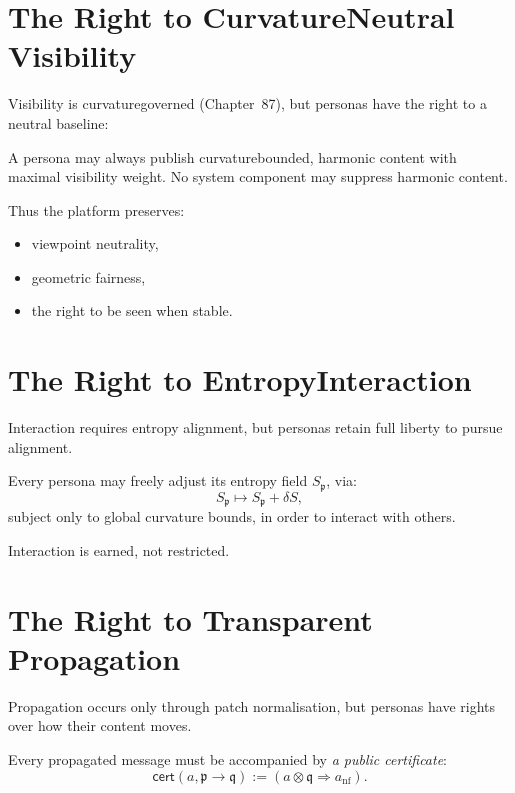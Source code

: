 \section{The Right to Curvature\textendash Neutral Visibility}

Visibility is curvature\textendash governed (Chapter~87),
but personas have the right to a neutral baseline:

\begin{invariant}
A persona may always publish curvature\textendash bounded, harmonic content
with maximal visibility weight.
No system component may suppress harmonic content.
\end{invariant}

Thus the platform preserves:
\begin{itemize}
    \item viewpoint neutrality,
    \item geometric fairness,
    \item the right to be seen when stable.
\end{itemize}

\section{The Right to Entropy\textendashAligned Interaction}

Interaction requires entropy alignment,
but personas retain full liberty to pursue alignment.

\begin{invariant}
Every persona may freely adjust its entropy field $S_{\mathfrak{p}}$,
via:
\[
S_{\mathfrak{p}} \mapsto S_{\mathfrak{p}} + \delta S,
\]
subject only to global curvature bounds,
in order to interact with others.
\end{invariant}

Interaction is earned,
not restricted.

\section{The Right to Transparent Propagation}

Propagation occurs only through patch normalisation,
but personas have rights over how their content moves.

\begin{invariant}
Every propagated message must be accompanied by
\emph{a public certificate}:
\[
\mathsf{cert}(a,\mathfrak{p}\to\mathfrak{q})
  := (a \otimes \mathfrak{q} \Rightarrow a_{\mathrm{nf}}).
\]
\end{invariant}

